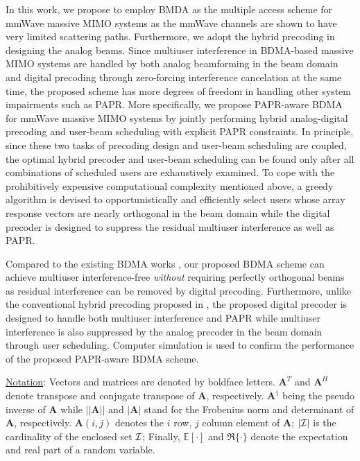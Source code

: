 \documentclass[conference]{IEEEtran}
\begin{document}
In this work, we propose to employ BMDA as the multiple access scheme for mmWave massive MIMO systems as the mmWave channels are shown to have very limited scattering paths. Furthermore, we adopt the hybrid precoding in designing the analog beams. Since multiuser interference in BDMA-based massive MIMO systems are handled by both analog beamforming in the beam domain and digital precoding through zero-forcing interference cancelation at the same time, the proposed scheme has more degrees of freedom in handling other system impairments such as PAPR. More specifically, we propose PAPR-aware BDMA for mmWave massive MIMO systems by jointly performing hybrid analog-digital precoding and user-beam scheduling with explicit PAPR constraints. In principle, since these two tasks of precoding design and user-beam scheduling are coupled, the optimal hybrid precoder and user-beam scheduling can be found only after all combinations of scheduled users are exhaustively examined. To cope with the prohibitively expensive computational complexity mentioned above, a greedy algorithm is devised to opportunistically and efficiently select users whose array response vectors are nearly orthogonal in the beam domain while the digital precoder is designed to suppress the residual multiuser interference as well as PAPR.


Compared to the existing BDMA works \cite{sun2015beam, Jiang2018}, our proposed BDMA scheme can achieve multiuser interference-free {\em without} requiring perfectly orthogonal beams as residual interference can be removed by digital precoding. 
Furthermore, unlike the conventional hybrid precoding proposed in \cite{alkhateeb2014channel}, the proposed digital precoder is designed to handle both multiuser interference and PAPR while multiuser interference is also suppressed by the analog precoder in the beam domain through user scheduling. Computer simulation is used to confirm the performance of the proposed PAPR-aware BDMA scheme.


\underline{Notation}: Vectors and matrices are denoted by boldface letters. ${\bm A}^T$ and ${\bm A}^H$ denote transpose and conjugate transpose of ${\bm A}$, respectively. $\bm{A}^\dagger$ being the pseudo inverse of $\bm{A}$ while $||\bm{A}|| $ and $|\bm{A}|$ stand for the Frobenius norm and determinant of ${\bm A}$, respectively. $\bm{A}(i,j)$ denotes the $i$ row, $j$ column element of ${\bm A}$; $|\cal{I}|$ is the cardinality of the enclosed set ${\cal I}$; Finally, $\mathbb{E}[\cdot] $ and $\Re\{\cdot\}$ denote the expectation and real part of a random variable.
\end{document}
